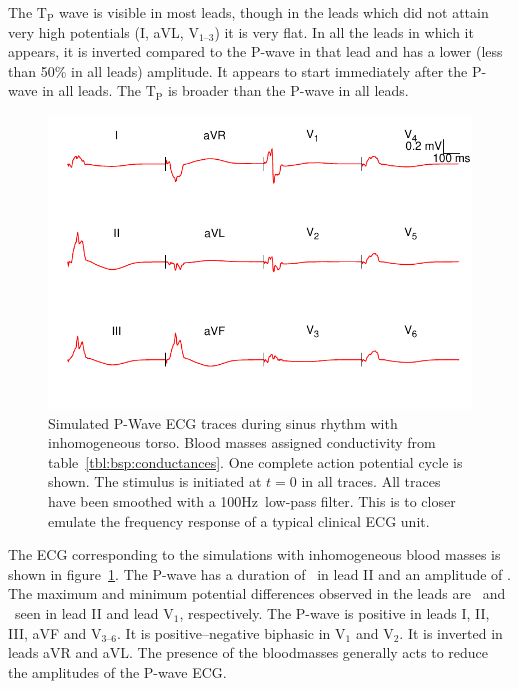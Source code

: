 The $\text{T}_{\text{P}}$ wave is
visible in most leads, though in the leads which did not attain very high
potentials (I, aVL, $\text{V}_{\text{1--3}}$) it is very flat.
In all the leads in which it appears, it is inverted compared to the P-wave in
that lead and has a lower (less than 50\% in all leads) amplitude.
It appears to start immediately after the P-wave in all leads.
The $\text{T}_{\text{P}}$ is broader than the P-wave in all leads.


\begin{figure}
\includegraphics{figures/bsp/ecg_blood}
\caption[12 lead ECG during sinus rhythm, bloodmasses present.]{
\label{bsp:fig:ecg_blood}
Simulated P-Wave ECG traces during sinus rhythm with inhomogeneous torso.
Blood masses assigned conductivity from table~\ref{tbl:bsp:conductances}.
One complete action potential cycle is shown.
The stimulus is initiated at $t = 0$ in all traces.
All traces have been smoothed with a \unit{100}{Hz}\ low-pass filter.
This is to closer emulate the frequency response of a typical clinical ECG unit.
}
\end{figure}

The ECG corresponding to the simulations with inhomogeneous blood masses is shown in
figure~\ref{bsp:fig:ecg_blood}.
The P-wave has a duration of \ in lead II and an amplitude of .
The maximum and minimum potential differences observed in the leads are
\ and \ seen in lead II and lead $\text{V}_{\text{1}}$, respectively.
The P-wave is positive in leads I, II, III, aVF and $\text{V}_{\text{3--6}}$.
It is positive--negative biphasic in $\text{V}_{\text{1}}$ and $\text{V}_{\text{2}}$.
It is inverted in leads aVR and aVL.
The presence of the bloodmasses generally acts to reduce the amplitudes of the
P-wave ECG.

